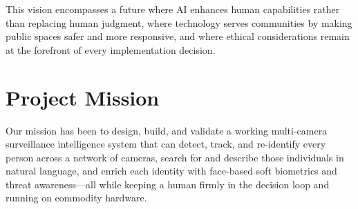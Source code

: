 \documentclass[12pt]{report}
\begin{document}
\vspace{0.5em}
\noindent This vision encompasses a future where AI enhances human capabilities rather than replacing human judgment, where technology serves communities by making public spaces safer and more responsive, and where ethical considerations remain at the forefront of every implementation decision.

\section{Project Mission}
Our mission has been to design, build, and validate a working multi-camera surveillance intelligence system that can detect, track, and re-identify every person across a network of cameras, search for and describe those individuals in natural language, and enrich each identity with face-based soft biometrics and threat awareness---all while keeping a human firmly in the decision loop and running on commodity hardware.
\end{document}

